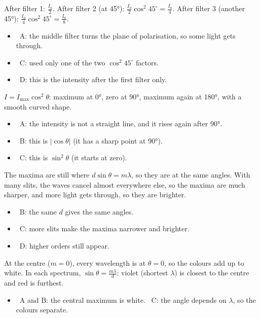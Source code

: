 \documentclass[12pt]{article}
\begin{document}
\begin{practiceanswers}
\begin{practiceans}
  After filter 1: $\frac{I_0}{2}$. After filter 2 (at \ang{45}): $\frac{I_0}{2}\cos^2 45^\circ = \frac{I_0}{4}$.
  After filter 3 (another \ang{45}): $\frac{I_0}{4}\cos^2 45^\circ = \frac{I_0}{8}$.
  \begin{itemize}
    \item \xmark\ A: the middle filter turns the plane of polarisation, so some light gets through.
    \item \xmark\ C: used only one of the two $\cos^2 45^\circ$ factors.
    \item \xmark\ D: this is the intensity after the first filter only.
  \end{itemize}
\end{practiceans}

\begin{practiceans}
  $I = I_\mathrm{max}\cos^2\theta$: maximum at \ang{0}, zero at \ang{90}, maximum again at \ang{180},
  with a smooth curved shape.
  \begin{itemize}
    \item \xmark\ A: the intensity is not a straight line, and it rises again after \ang{90}.
    \item \xmark\ B: this is $|\cos\theta|$ (it has a sharp point at \ang{90}).
    \item \xmark\ C: this is $\sin^2\theta$ (it starts at zero).
  \end{itemize}
\end{practiceans}

\begin{practiceans}
  The maxima are still where $d\sin\theta = m\lambda$, so they are at the same angles. With many slits,
  the waves cancel almost everywhere else, so the maxima are much sharper, and more light gets through,
  so they are brighter.
  \begin{itemize}
    \item \xmark\ B: the same $d$ gives the same angles.
    \item \xmark\ C: more slits make the maxima narrower and brighter.
    \item \xmark\ D: higher orders still appear.
  \end{itemize}
\end{practiceans}

\begin{practiceans}
  At the centre ($m = 0$), every wavelength is at $\theta = 0$, so the colours add up to white. In each
  spectrum, $\sin\theta = \frac{m\lambda}{d}$: violet (shortest $\lambda$) is closest to the centre and red is
  furthest.
  \begin{itemize}
    \item \xmark\ A and B: the central maximum is white. \quad \xmark\ C: the angle depends on
          $\lambda$, so the colours separate.
  \end{itemize}
\end{practiceans}


\end{practiceanswers}
\end{document}
